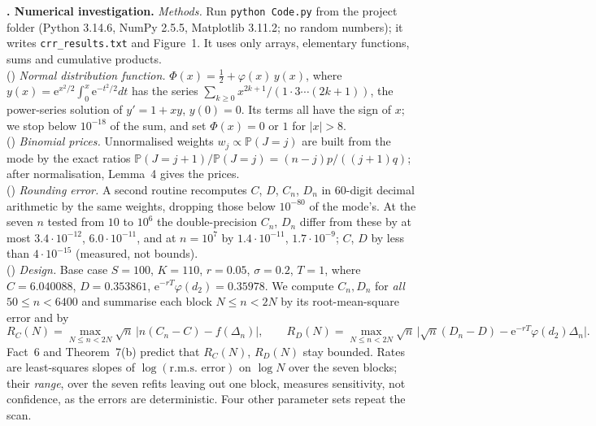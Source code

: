 \documentclass[11pt,a4paper]{article}
\theoremstyle{tight}
\theoremstyle{tightrm}
\newcounter{sect}\setcounter{sect}{-1}
\newcommand{\sect}[1]{\par\vspace{1.5pt}\noindent\stepcounter{sect}\textbf{\thesect. #1}\enspace}
\newcounter{meth}\renewcommand{\themeth}{M\arabic{meth}}
\newcommand{\meth}{\stepcounter{meth}(\themeth)}
\newcommand{\Prob}{\mathbb{P}}
\newcommand{\e}{\mathrm{e}}
\begin{document}
\sect{Numerical investigation.}
\emph{Methods.} Run \texttt{python Code.py} from the project folder (Python 3.14.6, NumPy 2.5.5, Matplotlib 3.11.2; no random numbers); it writes \texttt{crr\_results.txt} and Figure~1. It uses only arrays, elementary functions, sums and cumulative products.\\
\meth{} \emph{Normal distribution function.} $\Phi(x)=\tfrac12+\varphi(x)\,y(x)$, where $y(x)=\e^{x^2/2}\int_0^x\e^{-t^2/2}dt$ has the series $\sum_{k\ge0}x^{2k+1}/(1\cdot3\cdots(2k+1))$, the power-series solution of $y'=1+xy$, $y(0)=0$. Its terms all have the sign of $x$; we stop below $10^{-18}$ of the sum, and set $\Phi(x)=0$ or $1$ for $|x|>8$.\\
\meth{} \emph{Binomial prices.} Unnormalised weights $w_j\propto\Prob(J=j)$ are built from the mode by the exact ratios $\Prob(J=j+1)/\Prob(J=j)=(n-j)p/((j+1)q)$; after normalisation, Lemma~4 gives the prices.\\
\meth{} \emph{Rounding error.} A second routine recomputes $C$, $D$, $C_n$, $D_n$ in 60-digit decimal arithmetic by the same weights, dropping those below $10^{-80}$ of the mode's. At the seven $n$ tested from $10$ to $10^6$ the double-precision $C_n$, $D_n$ differ from these by at most $3.4\cdot10^{-12}$, $6.0\cdot10^{-11}$, and at $n=10^7$ by $1.4\cdot10^{-11}$, $1.7\cdot10^{-9}$; $C$, $D$ by less than $4\cdot10^{-15}$ (measured, not bounds).\\
\meth{} \emph{Design.} Base case $S=100$, $K=110$, $r=0.05$, $\sigma=0.2$, $T=1$, where $C=6.040088$, $D=0.353861$, $\e^{-rT}\varphi(d_2)=0.35978$. We compute $C_n,D_n$ for \emph{all} $50\le n<6400$ and summarise each block $N\le n<2N$ by its root-mean-square error and by
\[
R_C(N)=\max_{N\le n<2N}\sqrt n\,\big|n(C_n-C)-f(\Delta_n)\big|,\qquad R_D(N)=\max_{N\le n<2N}\sqrt n\,\big|\sqrt n(D_n-D)-\e^{-rT}\varphi(d_2)\Delta_n\big| .
\]
Fact~6 and Theorem~7(b) predict that $R_C(N)$, $R_D(N)$ stay bounded. Rates are least-squares slopes of $\log(\text{r.m.s.\ error})$ on $\log N$ over the seven blocks; their \emph{range}, over the seven refits leaving out one block, measures sensitivity, not confidence, as the errors are deterministic. Four other parameter sets repeat the scan.
\end{document}
